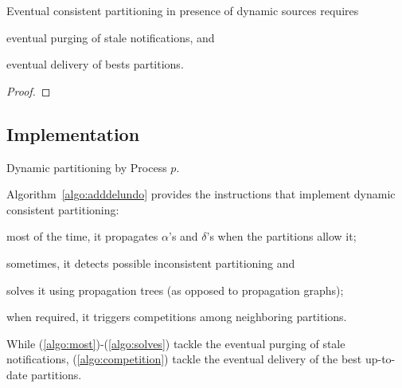 \begin{theorem}
  Eventual consistent partitioning in presence of dynamic sources
  requires
  \begin{inparaenum}[(i)]
  \item eventual purging of stale notifications, and
  \item eventual delivery of bests partitions.
  \end{inparaenum}
\end{theorem}

\begin{proof}
\end{proof}



\subsection{Implementation}

\begin{algorithm}
  
  \caption{\label{algo:adddelundo}Dynamic partitioning by Process $p$.}
\end{algorithm}

Algorithm~\ref{algo:adddelundo} provides the instructions that
implement dynamic consistent partitioning:
\begin{inparaenum}[(i)]
\item \label{algo:most} most of the time, it propagates $\alpha$'s and
  $\delta$'s when the partitions allow it;
\item \label{algo:sometimes} sometimes, it detects possible
  inconsistent partitioning and
\item \label{algo:solves}solves it using propagation trees (as opposed
  to propagation graphs);
\item \label{algo:competition} when required, it triggers competitions
  among neighboring partitions.
\end{inparaenum}
While (\ref{algo:most})-(\ref{algo:solves}) tackle the eventual purging of
stale notifications, (\ref{algo:competition}) tackle the eventual
delivery of the best up-to-date partitions.

